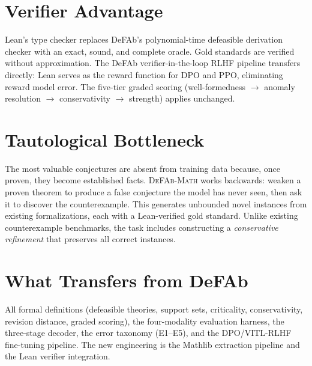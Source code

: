 \documentclass[11pt]{article}
\begin{document}
\section*{Verifier Advantage}

Lean's type checker replaces DeFAb's polynomial-time defeasible
derivation checker with an exact, sound, and complete oracle. Gold
standards are verified without approximation. The DeFAb
verifier-in-the-loop RLHF pipeline transfers directly: Lean serves as
the reward function for DPO and PPO, eliminating reward model error.
The five-tier graded scoring (well-formedness $\to$ anomaly resolution
$\to$ conservativity $\to$ strength) applies unchanged.

\section*{Tautological Bottleneck}

The most valuable conjectures are absent from training data because,
once proven, they become established facts. \textsc{DeFAb-Math} works
backwards: weaken a proven theorem to produce a false conjecture the
model has never seen, then ask it to discover the counterexample. This
generates unbounded novel instances from existing formalizations, each
with a Lean-verified gold standard. Unlike existing counterexample
benchmarks, the task includes constructing a \emph{conservative
refinement} that preserves all correct instances.

\section*{What Transfers from DeFAb}

All formal definitions (defeasible theories, support sets, criticality,
conservativity, revision distance, graded scoring), the four-modality
evaluation harness, the three-stage decoder, the error taxonomy
(E1--E5), and the DPO/VITL-RLHF fine-tuning pipeline. The new
engineering is the Mathlib extraction pipeline and the Lean verifier
integration.
\end{document}
